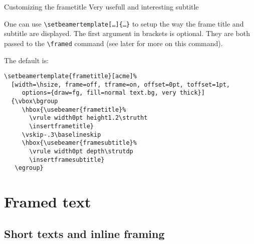 \documentclass[9pt]{beamer}
\def\com#1{\texttt{\textbackslash #1}}
\let\command\com
\begin{document}
\begin{frame}[fragile]
  {Customizing the frametitle}
  {Very usefull and interesting subtitle}

  One can use \command{setbeamertemplate[\dots]\{\dots\}} to setup the
  way the frame title and subtitle are displayed. The first argument in
  brackets is optional. They are both passed to the \command{framed}
  command (see later for more on this command).

  The default is:
\begin{verbatim}
\setbeamertemplate{frametitle}[acme]%
  [width=\hsize, frame=off, tframe=on, offset=0pt, toffset=1pt,
     options={draw=fg, fill=normal text.bg, very thick}]
  {\vbox\bgroup
     \hbox{\usebeamer{frametitle}%
       \vrule width0pt height1.2\strutht
       \insertframetitle}
     \vskip-.3\baselineskip
     \hbox{\usebeamer{framesubtitle}%
       \vrule width0pt depth\strutdp
       \insertframesubtitle}
   \egroup}
\end{verbatim}

\end{frame}



\section{Framed text}
\subsection{Short texts and inline framing}
\end{document}
